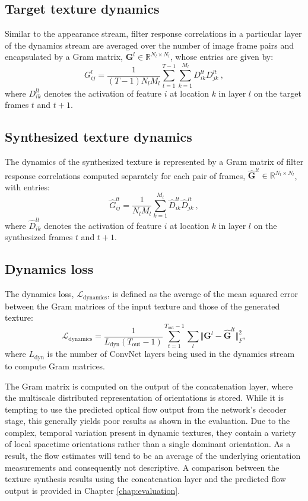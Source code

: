 \subsection{Target texture dynamics}

Similar to the appearance stream, filter response correlations
in a particular layer of the dynamics
stream are averaged over the number of image frame
pairs and encapsulated by a Gram matrix,
$\mathbf{G}^{l} \in \mathbb{R}^{N_l \times N_l}$,
whose entries are given by:
\begin{equation}
	G_{ij}^l = \frac{1}{(T-1) N_l M_l} \sum_{t=1}^{T-1} \sum_{k=1}^{M_l} D_{ik}^{lt} D_{jk}^{lt}\ ,	
\end{equation}
where $D_{ik}^{lt}$ denotes the activation of feature $i$ at
location $k$ in layer $l$ on the target frames $t$ and $t+1$.

\subsection{Synthesized texture dynamics}

The dynamics of the synthesized texture is represented
by a Gram matrix of filter response correlations 
computed separately for each pair of frames,
$\hat{\mathbf{G}}^{lt} \in \mathbb{R}^{N_l \times N_l}$,
with entries:
\begin{equation}
	\hat{G}_{ij}^{lt} = \frac{1}{N_l M_l} \sum_{k=1}^{M_l} \hat{D}_{ik}^{lt} \hat{D}_{jk}^{lt}\ ,	
\end{equation}
where $\hat{D}_{ik}^{lt}$ denotes the activation of feature $i$ at
location $k$ in layer $l$ on the synthesized frames $t$ and $t+1$.

\subsection{Dynamics loss}

The dynamics loss, $\mathcal{L}_\text{dynamics}$, is defined as
the average of the mean squared error between the Gram matrices
of the input texture
and those of the generated texture:
\begin{equation}
   \mathcal{L}_\text{dynamics} = \frac{1}{L_\text{dyn} (T_\text{out}-1)}\sum_{t=1}^{T_\text{out}-1} \sum_{l}  \Vert \mathbf{G}^l - \hat{\mathbf{G}}^{lt}\Vert^2_F, \label{eq:dynloss}
\end{equation}
where $L_\text{dyn}$ is the number of ConvNet layers being used
in the dynamics stream to compute Gram matrices.

The Gram matrix is computed on the output of the concatenation layer,
where the multiscale distributed representation of orientations is
stored. While it is tempting to use the predicted optical flow output from the
network's decoder stage, this generally yields poor results as shown in the evaluation.
Due to the complex, temporal variation present in dynamic
textures, they contain a variety of local spacetime
orientations rather than a single dominant orientation.
As a result, the flow estimates will tend to be an average of the
underlying  orientation measurements and consequently not
descriptive. A comparison between the texture synthesis results using the concatenation layer and the predicted flow output is provided in Chapter \ref{chap:evaluation}.

